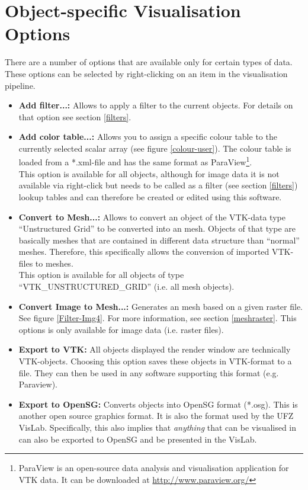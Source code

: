 \section{Object-specific Visualisation Options}
\label{specvisoptions}

There are a number of options that are available only for certain types of data. These options can be selected by right-clicking on an item in the visualisation pipeline.

\begin{itemize}
\item \textbf{Add filter...:} Allows to apply a filter to the current objects. For details on that option see section \ref{filters}.
\item \textbf{Add color table...:} Allows you to assign a specific colour table to the currently selected scalar array (see figure \ref{colour-user}). The colour table is loaded from a *.xml-file and has the same format as ParaView\footnote{ParaView is an open-source data analysis and visualisation application for VTK data. It can be downloaded at \url{http://www.paraview.org/}}.\\
    This option is available for all objects, although for image data it is not available via right-click but needs to be called as a filter (see section \ref{filters}) lookup tables and can therefore be created or edited using this software.
\item \textbf{Convert to Mesh...:} Allows to convert an object of the VTK-data type ``Unstructured Grid'' to be converted into an \ogs mesh. Objects of that type are basically meshes that are contained in different data structure than ``normal'' \ogs meshes. Therefore, this specifically allows the conversion of imported VTK-files to \ogs meshes.\\
    This option is available for all objects of type ``VTK\_UN\-STRUCT\-URED\_GRID'' (i.e. all mesh objects).
\item \textbf{Convert Image to Mesh...:} Generates an \ogs mesh based on a given raster file. See figure \ref{Filter-Img4}. For more information, see section \ref{meshraster}. This options is only available for image data (i.e. raster files).
\item \textbf{Export to VTK:} All objects displayed the render window are technically VTK-objects. Choosing this option saves these objects in VTK-format to a file. They can then be used in any software supporting this format (e.g. Paraview).
\item \textbf{Export to OpenSG:} Converts objects into OpenSG format (*.osg). This is another open source graphics format. It is also the format used by the UFZ VisLab. Specifically, this also implies that \emph{anything} that can be visualised in \ogs can also be exported to OpenSG and be presented in the VisLab.
\end{itemize}

